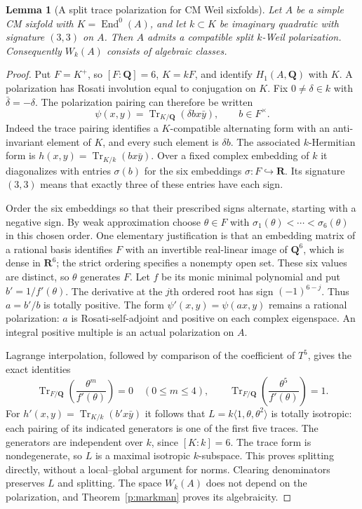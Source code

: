 \documentclass[11pt,reqno]{article}
\theoremstyle{emphasizedplain}
\theoremstyle{emphasizeddefinition}
\theoremstyle{emphasizeddefinition}
\newtheorem{prelemma}{Lemma}
\DeclareMathOperator{\End}{End}
\DeclareMathOperator{\Tr}{Tr}
\newcommand{\Q}{\mathbf Q}
\newcommand{\R}{\mathbf R}
\begin{document}
\begin{prelemma}[A split trace polarization for CM Weil sixfolds]
\label{p:CMsplit}
Let $A$ be a simple CM sixfold with $K=\End^0(A)$, and let
$k\subset K$ be imaginary quadratic with signature $(3,3)$ on $A$.
Then $A$ admits a compatible split $k$-Weil polarization. Consequently
$W_k(A)$ consists of algebraic classes.
\end{prelemma}
\begin{proof}
Put $F=K^+$, so $[F:\Q]=6$, $K=kF$, and identify $H_1(A,\Q)$
with $K$. A polarization has Rosati involution equal to conjugation on
$K$. Fix $0\ne\delta\in k$ with $\bar\delta=-\delta$.
The polarization pairing can therefore be written
\[
 \psi(x,y)=\Tr_{K/\Q}(\delta b x\bar y),\qquad b\in F^\times.
\]
Indeed the trace pairing identifies a $K$-compatible alternating form
with an anti-invariant element of $K$, and every such element is
$\delta b$. The associated $k$-Hermitian form is
$h(x,y)=\Tr_{K/k}(b x\bar y)$. Over a fixed complex embedding of $k$
it diagonalizes with entries $\sigma(b)$ for the six embeddings
$\sigma:F\hookrightarrow\R$. Its signature $(3,3)$ means that exactly
three of these entries have each sign.

Order the six embeddings so that their prescribed signs alternate,
starting with a negative sign. By weak approximation choose
$\theta\in F$ with
$\sigma_1(\theta)<\cdots<\sigma_6(\theta)$ in this chosen order.
One elementary justification is that an embedding matrix of a rational
basis identifies $F$ with an invertible real-linear image of $\Q^6$,
which is dense in $\R^6$; the strict ordering specifies a nonempty open
set. These six values are distinct, so $\theta$ generates $F$.
Let $f$ be its monic minimal polynomial and put $b'=1/f'(\theta)$.
The derivative at the $j$th ordered root has sign $(-1)^{6-j}$.
Thus $a=b'/b$ is totally positive. The form
$\psi'(x,y)=\psi(ax,y)$ remains a rational polarization: $a$ is
Rosati-self-adjoint and positive on each complex eigenspace. An
integral positive multiple is an actual polarization on $A$.

Lagrange interpolation, followed by comparison of the coefficient of
$T^5$, gives the exact identities
\[
 \Tr_{F/\Q}\!\left(\frac{\theta^m}{f'(\theta)}\right)=0
 \quad(0\le m\le4),\qquad
 \Tr_{F/\Q}\!\left(\frac{\theta^5}{f'(\theta)}\right)=1.
\]
For $h'(x,y)=\Tr_{K/k}(b'x\bar y)$ it follows that
$L=k\langle1,\theta,\theta^2\rangle$ is totally isotropic: each pairing
of its indicated generators is one of the first five traces.
The generators are independent over $k$, since $[K:k]=6$.
The trace form is nondegenerate, so $L$ is a maximal isotropic
$k$-subspace. This proves splitting directly, without a local--global
argument for norms. Clearing denominators preserves $L$ and splitting.
The space $W_k(A)$ does not depend on the polarization, and
Theorem~\ref{p:markman} proves its algebraicity.
\end{proof}
\end{document}
